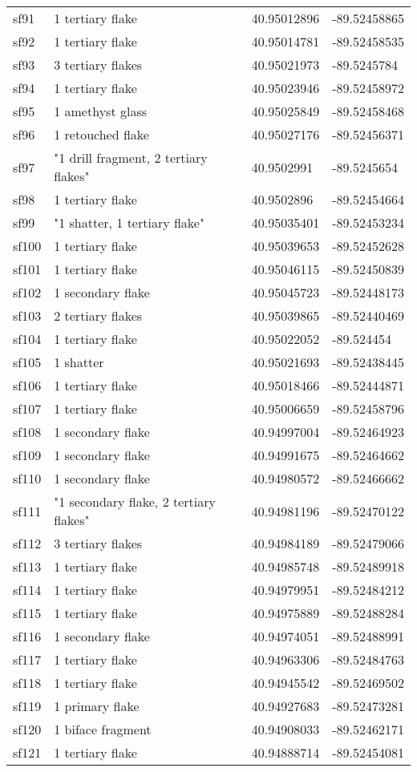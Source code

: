 \begin{longtable}{p{1cm}p{6cm}ll}
	sf91 & 1 tertiary flake & 40.95012896 & -89.52458865\\
	sf92 & 1 tertiary flake & 40.95014781 & -89.52458535\\
	sf93 & 3 tertiary flakes & 40.95021973 & -89.5245784\\
	sf94 & 1 tertiary flake & 40.95023946 & -89.52458972\\
	sf95 & 1 amethyst glass & 40.95025849 & -89.52458468\\
	sf96 & 1 retouched flake & 40.95027176 & -89.52456371\\
	sf97 & "1 drill fragment, 2 tertiary flakes" & 40.9502991 & -89.5245654\\
	sf98 & 1 tertiary flake & 40.9502896 & -89.52454664\\
	sf99 & "1 shatter, 1 tertiary flake" & 40.95035401 & -89.52453234\\
	sf100 & 1 tertiary flake & 40.95039653 & -89.52452628\\
	sf101 & 1 tertiary flake & 40.95046115 &-89.52450839\\
	sf102 & 1 secondary flake & 40.95045723 & -89.52448173\\
	sf103 & 2 tertiary flakes & 40.95039865 & -89.52440469\\
	sf104 & 1 tertiary flake & 40.95022052 & -89.524454\\
	sf105 & 1 shatter & 40.95021693 & -89.52438445\\
	sf106 & 1 tertiary flake & 40.95018466 & -89.52444871\\
	sf107 & 1 tertiary flake & 40.95006659 & -89.52458796\\
	sf108 & 1 secondary flake & 40.94997004 & -89.52464923\\
	sf109 & 1 secondary flake & 40.94991675 & -89.52464662\\
	sf110 & 1 secondary flake & 40.94980572 & -89.52466662\\
	sf111 & "1 secondary flake, 2 tertiary flakes" & 40.94981196 & -89.52470122\\
	sf112 & 3 tertiary flakes & 40.94984189 & -89.52479066\\
	sf113 & 1 tertiary flake & 40.94985748 & -89.52489918\\
	sf114 & 1 tertiary flake & 40.94979951 & -89.52484212\\
	sf115 & 1 tertiary flake & 40.94975889 & -89.52488284\\
	sf116 & 1 secondary flake & 40.94974051 & -89.52488991\\
	sf117 & 1 tertiary flake & 40.94963306 & -89.52484763\\
	sf118 & 1 tertiary flake & 40.94945542 & -89.52469502\\
	sf119 & 1 primary flake & 40.94927683 & -89.52473281\\
	sf120 & 1 biface fragment & 40.94908033 & -89.52462171\\
	sf121 & 1 tertiary flake & 40.94888714 & -89.52454081\\


\end{longtable}
